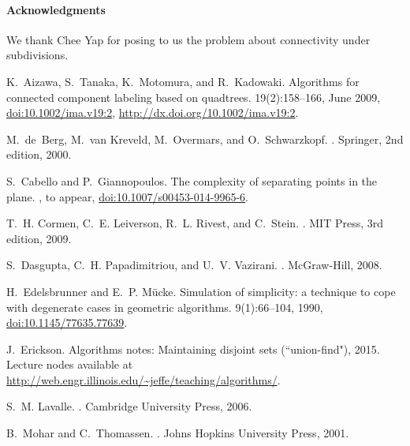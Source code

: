 \documentclass[a4paper,11pt]{article}
\begin{document}
\paragraph{Acknowledgments} We thank Chee Yap for posing to us the problem about connectivity under subdivisions.

\begin{thebibliography}{10}

K.~Aizawa, S.~Tanaka, K.~Motomura, and R.~Kadowaki.
\newblock Algorithms for connected component labeling based on quadtrees.
  19(2):158--166, June 2009, \href{http://dx.doi.org/10.1002/ima.v19:2}{doi:10.1002/ima.v19:2}, \url{http://dx.doi.org/10.1002/ima.v19:2}.

M.~de~Berg, M.~van Kreveld, M.~Overmars, and O.~Schwarzkopf.
.
\newblock Springer, 2nd edition, 2000.

S.~Cabello and P.~Giannopoulos.
\newblock The complexity of separating points in the plane.
, to appear,
  \href{http://dx.doi.org/10.1007/s00453-014-9965-6}{doi:10.1007/s00453-014-9965-6}.

T.~H. Cormen, C.~E. Leiverson, R.~L. Rivest, and C.~Stein.
.
\newblock MIT Press, 3rd edition, 2009.

S.~Dasgupta, C.~H. Papadimitriou, and U.~V. Vazirani.
.
\newblock McGraw-Hill, 2008.

H.~Edelsbrunner and E.~P. M{\"{u}}cke.
\newblock Simulation of simplicity: a technique to cope with degenerate cases
  in geometric algorithms.
 9(1):66--104, 1990,
  \href{http://dx.doi.org/10.1145/77635.77639}{doi:10.1145/77635.77639}.

J.~Erickson.
\newblock Algorithms notes: Maintaining disjoint sets (``union-find"), 2015.
\newblock Lecture nodes available at
  \url{http://web.engr.illinois.edu/~jeffe/teaching/algorithms/}.

S.~M. Lavalle.
.
\newblock Cambridge University Press, 2006.

B.~Mohar and C.~Thomassen.
.
\newblock Johns Hopkins University Press, 2001.


\end{thebibliography}
\end{document}
